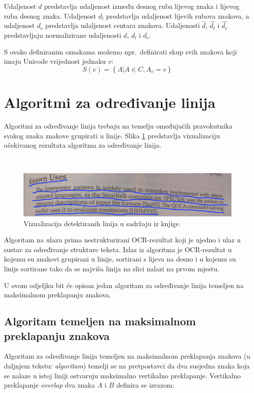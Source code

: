 \documentclass[times, utf8, zavrsni]{fer}
\begin{document}
Udaljenost $d$ predstavlja udaljenost između desnog ruba lijevog znaka i
lijevog ruba desnog znaka. Udaljenost $d_l$ predstavlja udaljenost lijevih
rubova znakova, a udaljenost $d_c$ predstavlja udaljenost centara znakova.
Udaljenosti $\hat{d}$, $\hat{d_l}$ i $\hat{d_c}$ predstavljaju normalizirane
udaljenosti $d$, $d_l$ i $d_c$.

S ovako definiranim oznakama možemo npr.\ definirati skup svih znakova koji
imaju Unicode vrijednost jednaku $v$:
\[ S(v) = \left\{A \vert A \in C, A_v = v\right\} \]

\pagebreak





\section{Algoritmi za određivanje linija}
\label{sec:algoritmi-za-odredivanje-linija}
Algoritmi za određivanje linija trebaju na temelju omeđujućih pravokutnika
svakog znaka znakove grupirati u linije. Slika \ref{fig:line-semgentation-01}
predstavlja vizualizaciju očekivanog rezultata algoritma za određivanje linija.

\

\begin{figure}[htb]
    \centering
    \captionsetup{justification=centering,margin=2cm}
    \includegraphics[width=\textwidth]{images/line-segmentation-01.jpg}
    \caption{
        Vizualizacija detektiranih linija u sadržaju iz knjige.
    }
    \label{fig:line-semgentation-01}
\end{figure}

Algoritam na ulazu prima nestrukturirani OCR-rezultat koji je ujedno i ulaz u
sustav za određivanje strukture teksta. Izlaz iz algoritma je OCR-rezultat u
kojemu su znakovi grupirani u linije, sortirani s lijeva na desno i u kojemu
su linije sortirane tako da se najviša linija na slici nalazi na prvom mjestu.

U ovom odjeljku bit će opisan jedan algoritam za određivanje linija temeljen
na maksimalnom preklapanju znakova.



\subsection{Algoritam temeljen na maksimalnom preklapanju znakova}
\label{subsec:algoritam-temeljen-na-maksimalnom-preklapanju-znakova}
Algoritam za određivanje linija temeljen na maksimalnom preklapanja znakova
(u daljnjem tekstu: \emph{algoritam}) temelji se na pretpostavci da dva susjedna
znaka koja se nalaze u istoj liniji ostvaruju maksimalno vertikalno preklapanje.
Vertikalno preklapanje \textit{overlap} dva znaka $A$ i $B$ definira se izrazom:
\end{document}
